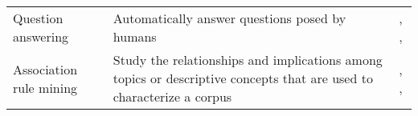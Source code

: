 \begin{table}[!h]
\begin{tabular}{m{4cm}m{5cm}m{4cm}}
Question answering           & Automatically answer questions posed by humans                                                                         & \cite{katz1997sentence}, \cite{kwok2001scaling}, \cite{aggarwal2012mining}                           \\ %
Association rule mining      & Study the relationships and implications among topics or descriptive concepts that are used to characterize a corpus & \cite{agrawal1993mining}, \cite{agrawal1994fast}, \cite{hu2010}                                      \\ \bottomrule
\end{tabular}
\end{table}
